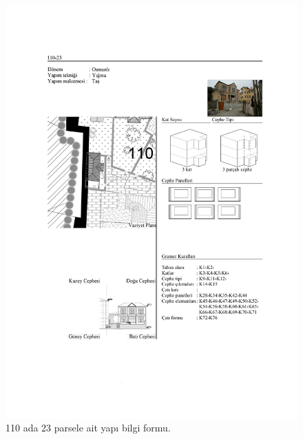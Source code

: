 \begin{figure}
\centering
\includegraphics[width=1\textwidth,height=\textheight]{source/figures/BilgiFormlari/110-23.pdf}
\caption{110 ada 23 parsele ait yapı bilgi formu.}
\end{figure}

